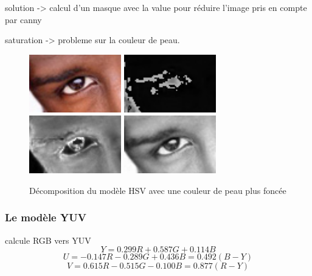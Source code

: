 solution -> calcul d'un masque avec la value pour réduire l'image pris en compte par canny

saturation -> probleme sur la couleur de peau.

\begin{figure}[H]
 \center
 \includegraphics[width=4cm]{image/original_black.png}
 \includegraphics[width=4cm]{image/hue_black.png}
 \includegraphics[width=4cm]{image/saturation_black.png}
 \includegraphics[width=4cm]{image/value_black.png}
 \caption{Décomposition du modèle HSV avec une couleur de peau plus foncée}
\end{figure}

\subsubsection{Le modèle YUV}

calcule RGB vers YUV
$$Y = 0.299R + 0.587 G + 0.114 B$$
$$U = -0.147R - 0.289 G + 0.436B = 0.492(B - Y)$$
$$V = 0.615R -0.515G -0.100B = 0.877(R-Y)$$


